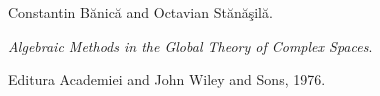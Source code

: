 Constantin B{\u a}nic{\u a} and Octavian St{\u a}n{\u a}{\c s}il{\u a}.

\newblock \emph{Algebraic Methods in the Global Theory of Complex Spaces}.

\newblock Editura Academiei and John Wiley and Sons, 1976.


